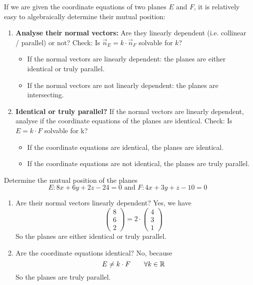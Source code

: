 \documentclass[12pt,eng]{skript_ogg}
\begin{document}
If we are given the coordinate equations of two planes $E$ and $F$, it is relatively easy to algebraically determine their mutual position:
\begin{enumerate}
	\item \textbf{Analyse their normal vectors:} Are they linearly dependent (i.e. collinear / parallel) or not? Check: Is $\vec{n}_E=k\cdot\vec{n}_F$ solvable for $k$?
	\begin{itemize}
	\setlength{\itemsep}{-1ex}
		\item If the normal vectors are linearly dependent: the planes are either identical or truly parallel.
		\item If the normal vectors are not linearly dependent: the planes are intersecting.
	\end{itemize}
	
	\item \textbf{Identical or truly parallel?} If the normal vectors are linearly dependent, analyse if the coordinate equations of the planes are identical. Check: Is $E=k\cdot F$ solvable for k?
		\begin{itemize}
		\setlength{\itemsep}{-1ex}
		\item If the coordinate equations are identical, the planes are identical.
		\item If the coordinate equations are not identical, the planes are truly parallel.
	\end{itemize}
	\end{enumerate}
	
\begin{beispiel}
Determine the mutual position of the planes
\[E:8x+6y+2z-24=0\text{ and }F:4x+3y+z-10=0\]
\begin{enumerate}
	\item Are their normal vectors linearly dependent? Yes, we have
	\[\begin{pmatrix}8\\6\\2\end{pmatrix}=2\cdot\begin{pmatrix}4\\3\\1\end{pmatrix}\]
	So the planes are either identical or truly parallel.
	\item Are the coordinate equations identical? No, because
	\[E\neq k\cdot F\qquad\forall k\in\mathbb{R}\]
	So the planes are truly parallel.	
\end{enumerate}
\end{beispiel}
\end{document}
